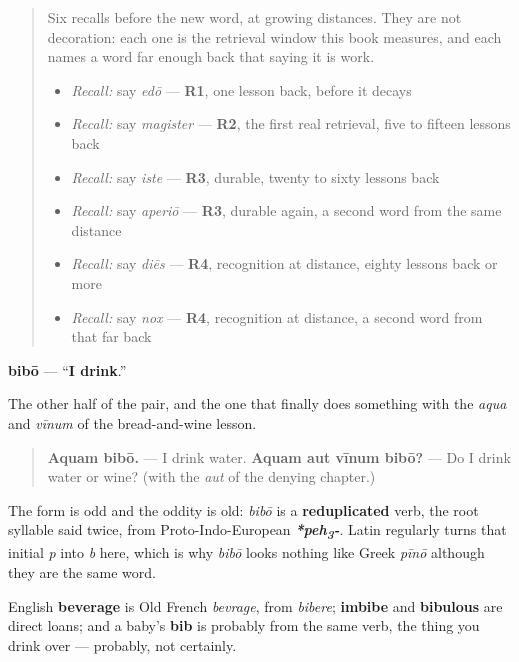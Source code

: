 \begin{quote}
Six recalls before the new word, at growing distances. They are not decoration: each one is the retrieval window this book measures, and each names a word far enough back that saying it is work.

\begin{itemize}
\raggedright
  \item \emph{Recall:} say \emph{edō} — \textbf{R1}, one lesson back, before it decays
  \item \emph{Recall:} say \emph{magister} — \textbf{R2}, the first real retrieval, five to fifteen lessons back
  \item \emph{Recall:} say \emph{iste} — \textbf{R3}, durable, twenty to sixty lessons back
  \item \emph{Recall:} say \emph{aperiō} — \textbf{R3}, durable again, a second word from the same distance
  \item \emph{Recall:} say \emph{diēs} — \textbf{R4}, recognition at distance, eighty lessons back or more
  \item \emph{Recall:} say \emph{nox} — \textbf{R4}, recognition at distance, a second word from that far back
\end{itemize}
\end{quote}

\begin{cousinweb}
\textbf{bibō} — \textquotedblleft{}\textbf{I drink}.\textquotedblright{}

The other half of the pair, and the one that finally does something with the \emph{aqua} and \emph{vīnum} of the bread-and-wine lesson.

\begin{quote}
\textbf{Aquam bibō.} — I drink water. \textbf{Aquam aut vīnum bibō?} — Do I drink water or wine? (with the \emph{aut} of the denying chapter.)
\end{quote}

The form is odd and the oddity is old: \emph{bibō} is a \textbf{reduplicated} verb, the root syllable said twice, from Proto-Indo-European \emph{\textbf{*peh\textsubscript{3}-}}. Latin regularly turns that initial \emph{p} into \emph{b} here, which is why \emph{bibō} looks nothing like Greek \emph{pīnō} although they are the same word.

English \textbf{beverage} is Old French \emph{bevrage}, from \emph{bibere}; \textbf{imbibe} and \textbf{bibulous} are direct loans; and a baby's \textbf{bib} is probably from the same verb, the thing you drink over — probably, not certainly.
\end{cousinweb}

